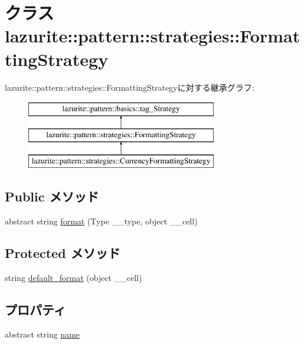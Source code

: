\hypertarget{classlazurite_1_1pattern_1_1strategies_1_1_formatting_strategy}{
\section{クラス lazurite::pattern::strategies::FormattingStrategy}
\label{classlazurite_1_1pattern_1_1strategies_1_1_formatting_strategy}
}
lazurite::pattern::strategies::FormattingStrategyに対する継承グラフ:\begin{figure}[H]
\begin{center}
\leavevmode
\includegraphics[height=3cm]{classlazurite_1_1pattern_1_1strategies_1_1_formatting_strategy}
\end{center}
\end{figure}
\subsection*{Public メソッド}
\begin{DoxyCompactItemize}
\item 
abstract string \hyperlink{classlazurite_1_1pattern_1_1strategies_1_1_formatting_strategy_a40cd8d7e44cef54b232ef86bc0492847}{format} (Type \_\-\_\-type, object \_\-\_\-cell)
\end{DoxyCompactItemize}
\subsection*{Protected メソッド}
\begin{DoxyCompactItemize}
\item 
string \hyperlink{classlazurite_1_1pattern_1_1strategies_1_1_formatting_strategy_ad7862a1ac98c237e254d43af42c2cfae}{default\_\-format} (object \_\-\_\-cell)
\end{DoxyCompactItemize}
\subsection*{プロパティ}
\begin{DoxyCompactItemize}
\item 
abstract string \hyperlink{classlazurite_1_1pattern_1_1strategies_1_1_formatting_strategy_a038a894580ec88e41ae22efead88c6e9}{name}
\end{DoxyCompactItemize}


